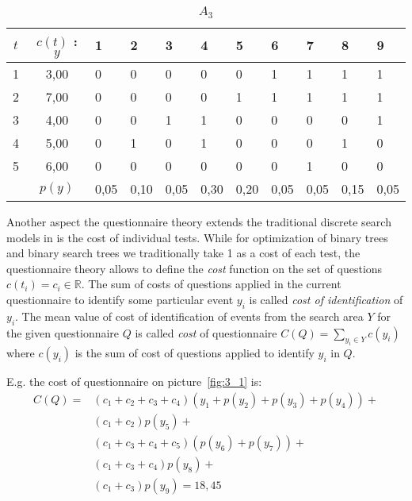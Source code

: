 \documentclass[11pt]{article}
\newcommand{\PreserveBackslash}[1]{\let\temp=\\#1\let\\=\temp}
\let\PBS=\PreserveBackslash
\begin{document}
\begin{table}[ht]
\begin{center}
\newcolumntype{M}{>{\small\PBS\centering}p{9mm}}
\begin{tabular}{|c||c||M|M|M|M|M|M|M|M|M|} \hline
$t$ & $c(t)$ : $y$ &  1 & 2 & 3 & 4 & 5 & 6 & 7 & 8 & 9  \\ \hline{} & 3,00 & 0 & 0 & 0 & 0 & 0 & 1 & 1 & 1 & 1 \\  & 7,00 & 0 & 0 & 0 & 0 & 1 & 1 & 1 & 1 & 1 \\  & 4,00 & 0 & 0 & 1 & 1 & 0 & 0 & 0 & 0 & 1  \\  & 5,00 & 0 & 1 & 0 & 1 & 0 & 0 & 0 & 1 & 0 \\  & 6,00 & 0 & 0 & 0 & 0 & 0 & 0 & 1 & 0 & 0 \\ \hline\hline
& $p(y)$ & 0,05 & 0,10 & 0,05 & 0,30 & 0,20 & 0,05 & 0,05 & 0,15 & 0,05 \\ \hline
\end{tabular}
\end{center}
\caption{$A_3$\label{tab:3}}
\end{table}

Another aspect the questionnaire theory extends the traditional discrete search models in is the cost of individual tests. While for optimization of binary trees and binary search trees we traditionally take 1 as a cost of each test, the questionnaire theory allows to define the \emph{cost} function on the set of questions $c(t_i)=c_i \in\mathbb{R}$. The sum of costs of questions applied in the current questionnaire to identify some particular event $y_i$ is called \emph{cost of identification} of $y_i$. The mean value of cost of identification of events from the search area $Y$ for the given questionnaire $Q$ is called \emph{cost} of questionnaire $C(Q)=\sum_{y_i \in Y}c(y_i)$ where $c(y_i)$ is the sum of cost of questions applied to identify $y_i$ in $Q$.

E.g. the cost of questionnaire on picture~\ref{fig:3_1} is:
\begin{equation}
\begin{split}
C(Q) = &(c_1+c_2+c_3+c_4)(y_1+p(y_2)+p(y_3)+p(y_4))+ \\
       &(c_1+c_2)p(y_5)+ \\
       &(c_1+c_3+c_4+c_5)(p(y_6)+p(y_7))+ \\
       &(c_1+c_3+c_4)p(y_8)+ \\
       &(c_1+c_3)p(y_9)=18,45 \label{eq:1}
\end{split}
\end{equation}
\end{document}
